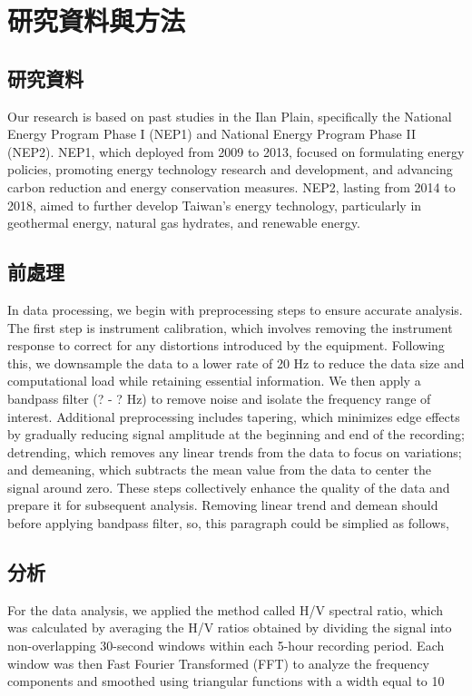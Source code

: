 
\chapter{研究資料與方法}

\section{研究資料}
Our research is based on past studies in the Ilan Plain, specifically the National Energy Program Phase I (NEP1) and National Energy Program Phase II (NEP2). NEP1, which deployed from 2009 to 2013, focused on formulating energy policies, promoting energy technology research and development, and advancing carbon reduction and energy conservation measures. NEP2, lasting from 2014 to 2018, aimed to further develop Taiwan's energy technology, particularly in geothermal energy, natural gas hydrates, and renewable energy.

\section{前處理}
In data processing, we begin with preprocessing steps to ensure accurate analysis. The first step is instrument calibration, which involves removing the instrument response to correct for any distortions introduced by the equipment. Following this, we downsample the data to a lower rate of 20 Hz to reduce the data size and computational load while retaining essential information. We then apply a bandpass filter (? - ? Hz) to remove noise and isolate the frequency range of interest. Additional preprocessing includes tapering, which minimizes edge effects by gradually reducing signal amplitude at the beginning and end of the recording; detrending, which removes any linear trends from the data to focus on variations; and demeaning, which subtracts the mean value from the data to center the signal around zero. These steps collectively enhance the quality of the data and prepare it for subsequent analysis. Removing linear trend and demean should before applying bandpass filter, so, this paragraph could be simplied as follows,

\section{分析}

For the data analysis, we applied the method called H/V spectral ratio, which was calculated by averaging the H/V ratios obtained by dividing the signal into non-overlapping 30-second windows within each 5-hour recording period. Each window was then Fast Fourier Transformed (FFT) to analyze the frequency components and smoothed using triangular functions with a width equal to 10%

